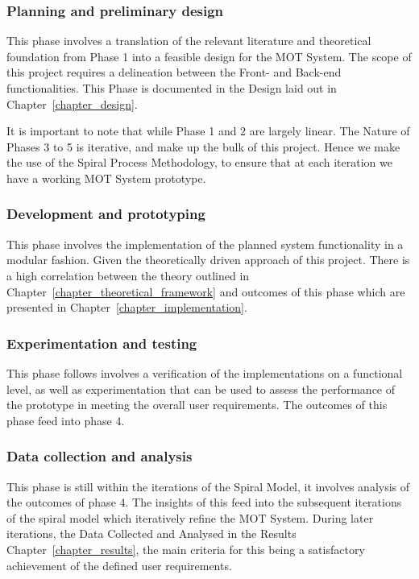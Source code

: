 \subsubsection{Planning and preliminary design}
This phase involves a translation of the relevant literature and theoretical
foundation from Phase 1 into a feasible design for the MOT System. The scope of
this project requires a delineation between the Front- and Back-end
functionalities. This Phase is documented in the Design laid out in
Chapter~\ref{chapter_design}.

It is important to note that while Phase 1 and 2 are largely linear. The Nature
of Phases 3 to 5 is iterative, and make up the bulk of this project. Hence we
make the use of the Spiral Process Methodology, to ensure that at each iteration
we have a working MOT System prototype.  

\subsubsection{Development and prototyping}
This phase involves the implementation of the planned system functionality in a
modular fashion. Given the theoretically driven approach of this project. There
is a high correlation between the theory outlined in
Chapter~\ref{chapter_theoretical_framework} and outcomes of this phase which are
presented in Chapter~\ref{chapter_implementation}.

\subsubsection{Experimentation and testing}
This phase follows involves a verification of the implementations on a
functional level, as well as experimentation that can be used to assess the
performance of the prototype in meeting the overall user requirements. The
outcomes of this phase feed into phase 4. 

\subsubsection{Data collection and analysis}
This phase is still within the iterations of the Spiral Model, it involves
analysis of the outcomes of phase 4. The insights of this feed into the 
subsequent iterations of the spiral model which iteratively refine the MOT
System. 
During later iterations, the Data Collected and Analysed in the Results
Chapter~\ref{chapter_results}, the main criteria for this being a satisfactory achievement
of the defined user requirements.

